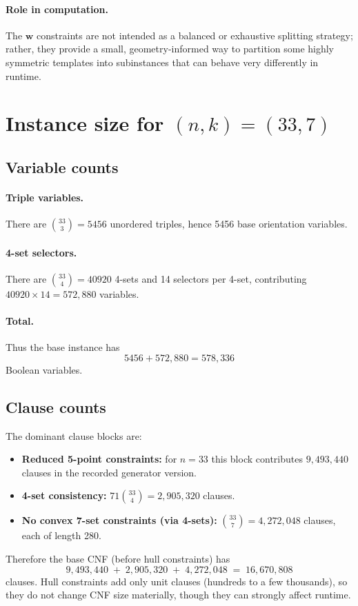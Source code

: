 \documentclass[11pt,a4paper]{article}
\theoremstyle{definition}
\begin{document}
\paragraph{Role in computation.}
The $\mathbf{w}$ constraints are not intended as a balanced or exhaustive splitting strategy; rather, they provide a small, geometry-informed way to partition some highly symmetric templates into subinstances that can behave very differently in runtime.

\section{Instance size for $(n,k)=(33,7)$}

\subsection{Variable counts}

\paragraph{Triple variables.}
There are $\binom{33}{3}=5456$ unordered triples, hence 5456 base orientation variables.

\paragraph{4-set selectors.}
There are $\binom{33}{4}=40920$ 4-sets and 14 selectors per 4-set, contributing $40920\times 14=572{,}880$ variables.

\paragraph{Total.}
Thus the base instance has
\[
5456 + 572{,}880 = 578{,}336
\]
Boolean variables.

\subsection{Clause counts}

The dominant clause blocks are:
\begin{itemize}
\item \textbf{Reduced 5-point constraints:} for $n=33$ this block contributes $9{,}493{,}440$ clauses in the recorded generator version.
\item \textbf{4-set consistency:} $71\binom{33}{4} = 2{,}905{,}320$ clauses.
\item \textbf{No convex 7-set constraints (via 4-sets):} $\binom{33}{7}=4{,}272{,}048$ clauses, each of length 280.
\end{itemize}
Therefore the base CNF (before hull constraints) has
\[
9{,}493{,}440 \;+\; 2{,}905{,}320 \;+\; 4{,}272{,}048
\;=\;
16{,}670{,}808
\]
clauses. Hull constraints add only unit clauses (hundreds to a few thousands), so they do not change CNF size materially, though they can strongly affect runtime.
\end{document}

